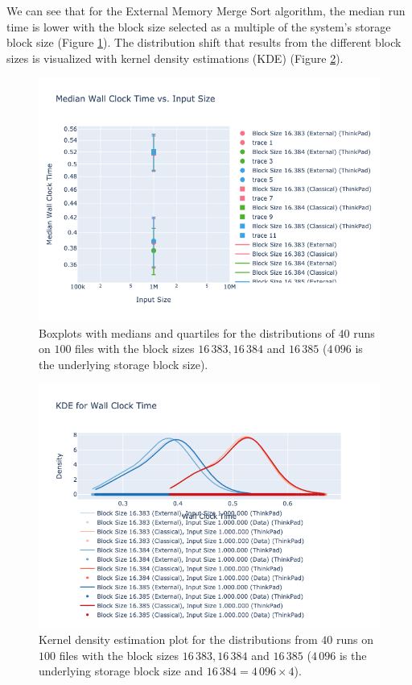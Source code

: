 \documentclass[twocolumn]{article}
\begin{document}
We can see that for the External Memory Merge Sort algorithm, the median run time is lower with the block size selected as a multiple of the system's storage block size
(Figure \ref{fig:visualization_multiples_block_size.png}).
The distribution shift that results from the different block sizes is visualized with kernel density estimations (KDE) (Figure \ref{fig:kde_plot_multiples_block_size.png}).
\begin{figure}
    \centering
    \includegraphics[width=0.8 \textwidth]{./res/visualization_multiples_block_size.png}
    \caption{Boxplots with medians and quartiles for the distributions of \( 40 \) runs on \( 100 \) files with the block sizes \( 16\,383, 16\,384 \) and \( 16\,385\) (\(4\,096\) is
        the underlying storage block size).}
    \label{fig:visualization_multiples_block_size.png}
\end{figure}
\begin{figure}
    \centering
    \includegraphics[width=0.8 \textwidth]{./res/kde_plot_multiples_block_size.png}
    \caption{Kernel density estimation plot for the distributions from \( 40 \) runs on \( 100 \) files with the block sizes \( 16\,383, 16\,384 \) and \( 16\,385 \) (\(4\,096\) is the underlying storage block size and
        \( 16\,384 = 4\,096 \times 4 \)).}
    \label{fig:kde_plot_multiples_block_size.png}
\end{figure}
\end{document}
